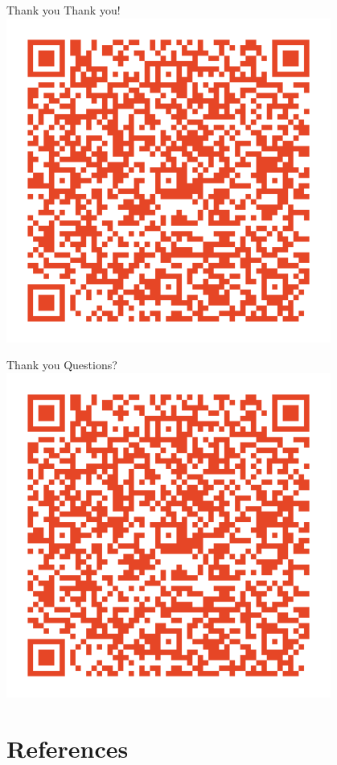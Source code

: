 \documentclass[t]{beamer} 	%
\begin{document}
\begin{frame}[c]{Thank you}
	\centering
	Thank you! \\
	\includegraphics[width=0.8\textwidth]{images/URL.png}
\end{frame}

\begin{frame}[c]{Thank you}
	\centering
	Questions? \\
	\includegraphics[width=0.8\textwidth]{images/URL.png}
\end{frame}

\section*{References}

\AtBeginSection{}

\begin{frame}[allowframebreaks]
	
	
\end{frame}
\end{document}
